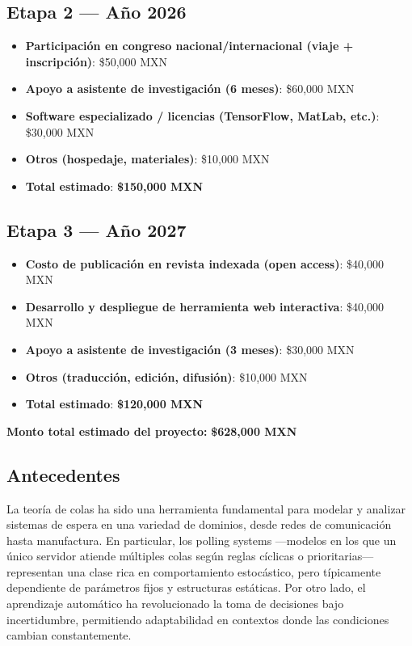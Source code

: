 \documentclass[12pt]{article}
\begin{document}
\subsection*{Etapa 2 — Año 2026}
\begin{itemize}
  \item \textbf{Participación en congreso nacional/internacional (viaje + inscripción)}: \$50,000 MXN
  \item \textbf{Apoyo a asistente de investigación (6 meses)}: \$60,000 MXN
  \item \textbf{Software especializado / licencias (TensorFlow, MatLab, etc.)}: \$30,000 MXN
  \item \textbf{Otros (hospedaje, materiales)}: \$10,000 MXN
  \item \textbf{Total estimado}: \textbf{\$150,000 MXN}
\end{itemize}

\subsection*{Etapa 3 — Año 2027}
\begin{itemize}
  \item \textbf{Costo de publicación en revista indexada (open access)}: \$40,000 MXN
  \item \textbf{Desarrollo y despliegue de herramienta web interactiva}: \$40,000 MXN
  \item \textbf{Apoyo a asistente de investigación (3 meses)}: \$30,000 MXN
  \item \textbf{Otros (traducción, edición, difusión)}: \$10,000 MXN
  \item \textbf{Total estimado}: \textbf{\$120,000 MXN}
\end{itemize}

\textbf{Monto total estimado del proyecto:} \textbf{\$628,000 MXN}




\subsection*{Antecedentes}

La teoría de colas ha sido una herramienta fundamental para modelar y analizar sistemas de espera en una variedad de dominios, desde redes de comunicación hasta manufactura. En particular, los polling systems —modelos en los que un único servidor atiende múltiples colas según reglas cíclicas o prioritarias— representan una clase rica en comportamiento estocástico, pero típicamente dependiente de parámetros fijos y estructuras estáticas. Por otro lado, el aprendizaje automático ha revolucionado la toma de decisiones bajo incertidumbre, permitiendo adaptabilidad en contextos donde las condiciones cambian constantemente.
\end{document}
